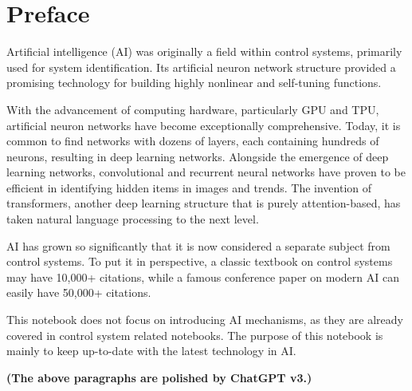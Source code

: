 \chapter*{Preface}

Artificial intelligence (AI) was originally a field within control systems, primarily used for system identification. Its artificial neuron network structure provided a promising technology for building highly nonlinear and self-tuning functions.

With the advancement of computing hardware, particularly GPU and TPU, artificial neuron networks have become exceptionally comprehensive. Today, it is common to find networks with dozens of layers, each containing hundreds of neurons, resulting in deep learning networks. Alongside the emergence of deep learning networks, convolutional and recurrent neural networks have proven to be efficient in identifying hidden items in images and trends. The invention of transformers, another deep learning structure that is purely attention-based, has taken natural language processing to the next level.

AI has grown so significantly that it is now considered a separate subject from control systems. To put it in perspective, a classic textbook on control systems may have 10,000+ citations, while a famous conference paper on modern AI can easily have 50,000+ citations.

This notebook does not focus on introducing AI mechanisms, as they are already covered in control system related notebooks. The purpose of this notebook is mainly to keep up-to-date with the latest technology in AI.

\vspace{.2in}

\noindent \textbf{(The above paragraphs are polished by ChatGPT v3.)}

